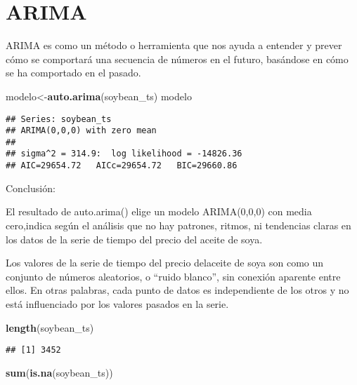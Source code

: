 \documentclass[
]{book}
\newenvironment{Shaded}{\begin{snugshade}}{\end{snugshade}}
\newcommand{\FunctionTok}[1]{\textcolor[rgb]{0.13,0.29,0.53}{\textbf{#1}}}
\newcommand{\NormalTok}[1]{#1}
\newcommand{\OtherTok}[1]{\textcolor[rgb]{0.56,0.35,0.01}{#1}}
\begin{document}
\hypertarget{arima}{%
\chapter{ARIMA}\label{arima}}

ARIMA es como un método o herramienta que nos ayuda a entender y prever cómo se comportará una secuencia de números en el futuro, basándose en cómo se ha comportado en el pasado.

\begin{Shaded}
\begin{Highlighting}[]
\NormalTok{modelo}\OtherTok{\textless{}{-}}\FunctionTok{auto.arima}\NormalTok{(soybean\_ts)}
\NormalTok{modelo}
\end{Highlighting}
\end{Shaded}

\begin{verbatim}
## Series: soybean_ts 
## ARIMA(0,0,0) with zero mean 
## 
## sigma^2 = 314.9:  log likelihood = -14826.36
## AIC=29654.72   AICc=29654.72   BIC=29660.86
\end{verbatim}

Conclusión:

El resultado de auto.arima() elige un modelo ARIMA(0,0,0) con media cero,indica según el análisis que no hay patrones, ritmos, ni tendencias claras en los datos de la serie de tiempo del precio del aceite de soya.

Los valores de la serie de tiempo del precio delaceite de soya son como un conjunto de números aleatorios, o ``ruido blanco'', sin conexión aparente entre ellos. En otras palabras, cada punto de datos es independiente de los otros y no está influenciado por los valores pasados en la serie.

\begin{Shaded}
\begin{Highlighting}[]
\FunctionTok{length}\NormalTok{(soybean\_ts)}
\end{Highlighting}
\end{Shaded}

\begin{verbatim}
## [1] 3452
\end{verbatim}

\begin{Shaded}
\begin{Highlighting}[]
\FunctionTok{sum}\NormalTok{(}\FunctionTok{is.na}\NormalTok{(soybean\_ts))}
\end{Highlighting}
\end{Shaded}
\end{document}
